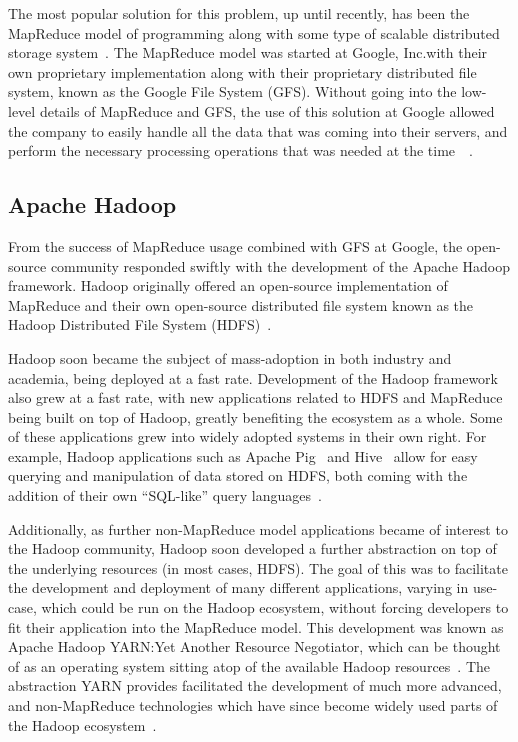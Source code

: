 \documentclass[a4paper,11pt]{article}
\begin{document}
The most popular solution for this problem, up until recently, has been the MapReduce model of programming along with
some type of scalable distributed storage system~\cite{bifet_mining_2013}. The MapReduce model was started at Google,
Inc.\@ with their own proprietary implementation along with their proprietary distributed file system, known as the Google
File System (GFS). Without going into the low-level details of MapReduce and GFS, the use of this solution at Google
allowed the company to easily handle all the data that was coming into their servers, and perform the necessary
processing operations that was needed at the time~\cite{ghemawat_google_2003}~\cite{dean_mapreduce:_2008}.


\subsection{Apache Hadoop} %
\label{sub:apache_hadoop}

From the success of MapReduce usage combined with GFS at Google, the open-source community responded swiftly with the
development of the Apache Hadoop framework. Hadoop originally offered an open-source implementation of MapReduce and
their own open-source distributed file system known as the Hadoop Distributed File System
(HDFS)~\cite{shvachko_hadoop_2010}.

Hadoop soon became the subject of mass-adoption in both industry and academia, being deployed at a fast rate.
Development of the Hadoop framework also grew at a fast rate, with new applications related to HDFS and MapReduce being
built on top of Hadoop, greatly benefiting the ecosystem as a whole. Some of these applications grew into widely adopted
systems in their own right. For example, Hadoop applications such as Apache Pig~\cite{gates_building_2009} and
Hive~\cite{thusoo_hive_2010} allow for easy querying and manipulation of data stored on HDFS, both coming with the
addition of their own ``SQL-like'' query languages~\cite{olston_pig_2008}.

Additionally, as further non-MapReduce model applications became of interest to the Hadoop community, Hadoop soon
developed a further abstraction on top of the underlying resources (in most cases, HDFS). The goal of this was to
facilitate the development and deployment of many different applications, varying in use-case, which could be run on the
Hadoop ecosystem, without forcing developers to fit their application into the MapReduce model. This development was
known as Apache Hadoop YARN:\@ Yet Another Resource Negotiator, which can be thought of as an operating system sitting
atop of the available Hadoop resources~\cite{vavilapalli_apache_2013}. The abstraction YARN provides facilitated the
development of much more advanced, and non-MapReduce technologies which have since become widely used parts of the
Hadoop ecosystem~\cite{harrison_hadoops_2012}.
\end{document}
